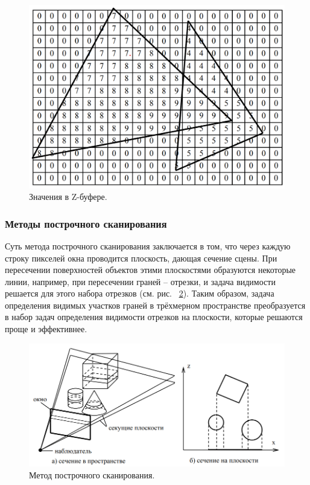 \begin{figure}[H]
    \centering
    \includegraphics[width=\textwidth]{img/Zbuff_algorithm_1.png}
    \caption{Значения в Z-буфере.}
    \label{fig:Zbuff_algorithm_1}
\end{figure}



\subsubsection{Методы построчного сканирования}

\hspace{1.25cm}
Суть метода построчного сканирования заключается в том,
что через каждую строку пикселей окна проводится плоскость, дающая сечение сцены. При пересечении поверхностей объектов этими плоскостями
образуются некоторые линии, например, при пересечении граней – отрезки, и задача видимости решается для этого набора отрезков (см. рис. ~\ref{fig:string_algorithms_1}). Таким образом, задача определения видимых участков граней в трёхмерном пространстве преобразуется в набор задач определения видимости отрезков на плоскости, которые решаются проще и эффективнее. 

\begin{figure}[H]
    \centering
    \includegraphics[width=\textwidth]{img/string_algorithms_1.png}
    \caption{Метод построчного сканирования.}
    \label{fig:string_algorithms_1}
\end{figure}

